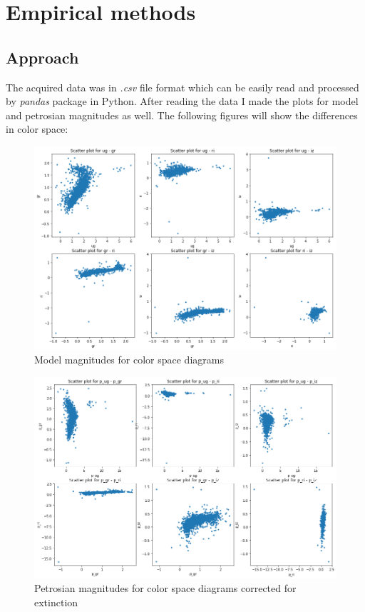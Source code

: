 \documentclass[a4paper,12pt]{article}
\begin{document}
\section{Empirical methods}

\subsection{Approach}

\par The acquired data was in \textit{.csv} file format
which can be easily read and processed by \textit{pandas}
package \cite{pandas} in \textmd{Python}. After reading the data
I made the plots for model and petrosian magnitudes as well. The
following figures will show the differences in color space:

\begin{figure}[H]
	\centering
	\includegraphics[width=1.\textwidth]{./modelmagscolor.png}
	\caption{ Model magnitudes for color space diagrams }
\end{figure}

\begin{figure}[H]
	\centering
	\includegraphics[width=1.\textwidth]{./petromagscolor.png}
	\caption{ Petrosian magnitudes for color space diagrams corrected for extinction }
\end{figure}
\end{document}

